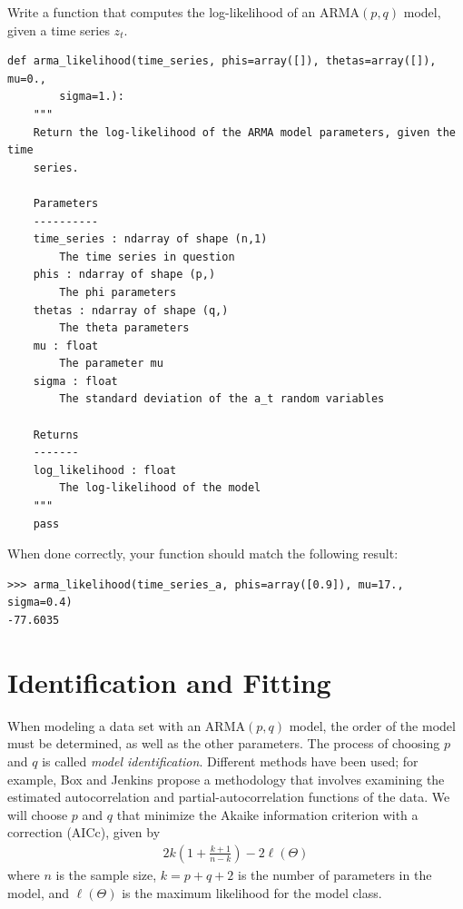 \begin{problem}
\label{prob:arma:likelihood}
Write a function that computes the log-likelihood of an $\text{ARMA}(p,q)$
model, given a time series $z_t$.

\begin{lstlisting}
def arma_likelihood(time_series, phis=array([]), thetas=array([]), mu=0.,
        sigma=1.):
    """
    Return the log-likelihood of the ARMA model parameters, given the time
    series.

    Parameters
    ----------
    time_series : ndarray of shape (n,1)
        The time series in question
    phis : ndarray of shape (p,)
        The phi parameters
    thetas : ndarray of shape (q,)
        The theta parameters
    mu : float
        The parameter mu
    sigma : float
        The standard deviation of the a_t random variables

    Returns
    -------
    log_likelihood : float
        The log-likelihood of the model
    """
    pass
\end{lstlisting}

\vspace{3mm} \noindent
When done correctly, your function should match the following result:
\begin{lstlisting}
>>> arma_likelihood(time_series_a, phis=array([0.9]), mu=17., sigma=0.4)
-77.6035
\end{lstlisting}
\end{problem}

\section*{Identification and Fitting}

When modeling a data set with an $\text{ARMA}(p,q)$ model, the order of the
model must be determined, as well as the other parameters. The process of
choosing $p$ and $q$ is called \emph{model identification}. Different methods have
been used; for example, Box and Jenkins propose a methodology that involves
examining the estimated autocorrelation and partial-autocorrelation functions
of the data. We will choose $p$ and $q$ that minimize the Akaike information
criterion with a correction (AICc), given by
\begin{align}
    2k\left(1 + \frac{k+1}{n-k}\right) - 2 \ell(\Theta)
\end{align}
where $n$ is the sample size, $k = p + q + 2$ is the number of parameters in
the model, and $\ell(\Theta)$ is the maximum likelihood for the model class.

